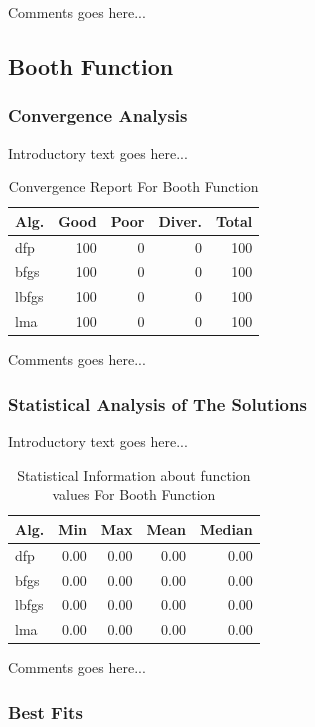 \documentclass{ieeeaccess}
\begin{document}
Comments goes here...
\subsection{Booth Function}
\label{booth2D}

\subsubsection{Convergence Analysis}
\label{convergencebooth2D}


Introductory text goes here...
\begin{table}
\centering
\caption{Convergence Report For Booth Function}
\label{convergence:booth}
\begin{tabular}{lrrrr}
\toprule
 Alg. &  Good &  Poor &  Diver. &  Total \\
\midrule
  dfp &   100 &     0 &       0 &    100 \\
 bfgs &   100 &     0 &       0 &    100 \\
lbfgs &   100 &     0 &       0 &    100 \\
  lma &   100 &     0 &       0 &    100 \\
\bottomrule
\end{tabular}
\end{table}


Comments goes here...
\subsubsection{Statistical Analysis of The Solutions}
\label{statisticalanalysisbooth2D}


Introductory text goes here...
\begin{table}
\centering
\caption{Statistical Information about function values For Booth Function}
\label{function_values:booth}
\begin{tabular}{lrrrr}
\toprule
 Alg. &  Min &  Max &  Mean &  Median \\
\midrule
  dfp & 0.00 & 0.00 &  0.00 &    0.00 \\
 bfgs & 0.00 & 0.00 &  0.00 &    0.00 \\
lbfgs & 0.00 & 0.00 &  0.00 &    0.00 \\
  lma & 0.00 & 0.00 &  0.00 &    0.00 \\
\bottomrule
\end{tabular}
\end{table}


Comments goes here...
\subsubsection{Best Fits}
\label{bestfitsbooth2D}
\end{document}
